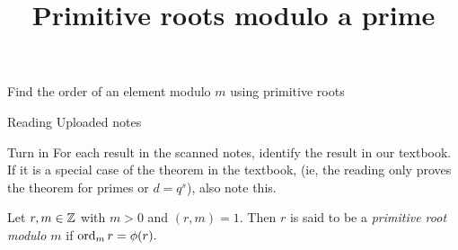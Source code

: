 \documentclass{ximera}
\title{Primitive roots modulo a prime}
\begin{document}
\begin{abstract}
\end{abstract}
\maketitle


\begin{obj}
    \item Find the order of an element modulo $m$ using primitive roots
\end{obj}

\begin{instructorNotes}
\begin{pre}
    \item[Reading] Uploaded notes
    \item[Turn in] For each result in the scanned notes, identify the result in our textbook. If it is a special case of the theorem in the textbook, (ie, the reading only proves the theorem for primes or $d=q^s$), also note this.

\end{pre}
    
\end{instructorNotes}


\begin{definition}\label{defn:prime-root}
    Let $r,m\in\mathbb Z$ with $m>0$ and $(r,m)=1.$ Then $r$ is said to be a \emph{primitive root modulo $m$} if $\operatorname{ord}_m r=\phi(r).$
\end{definition}
\end{document}

